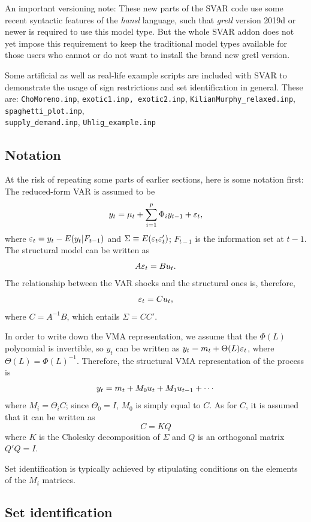 \documentclass[a4paper,10pt]{article}
\newcounter{script}[section]
\newcommand{\PrE}[1]{\ensuremath \varepsilon_{#1}}
\newcommand{\StS}[1]{\ensuremath u_{#1}}
\begin{document}
An important versioning note: These new parts of the SVAR code use some recent 
syntactic features of the \textsl{hansl} language, such that \textsl{gretl} version 
2019d or newer is required to use this model type.
But the whole SVAR addon does not yet impose this requirement to keep the traditional
model types available for those users who cannot or do not want to install the brand
new gretl version.

Some artificial as well as real-life example scripts are included with SVAR to demonstrate
the usage of sign restrictions and set identification in general. These are: 
\texttt{ChoMoreno.inp}, \texttt{exotic1.inp, exotic2.inp}, \texttt{KilianMurphy\_relaxed.inp}, 
\texttt{spaghetti\_plot.inp}, \\
\texttt{supply\_demand.inp}, \texttt{Uhlig\_example.inp}

\subsection{Notation}

At the risk of repeating some parts of earlier sections, here is some notation first:
The reduced-form VAR is assumed to be
\[
  y_t  =  \mu_t + \sum_{i=1}^p \Phi_i y_{t-1} + \PrE{t}, 
\]
where $\PrE{t} = y_t - E(y_t |F_{t-1})$ and
$\Sigma \equiv E(\PrE{t} \PrE{t}')$; $F_{t-1}$ is the information set
at $t-1$. The structural model can be written as
\[
  A \PrE{t} = B \StS{t} .
\]
The relationship between the VAR shocks and the structural ones is,
therefore,
\[
\PrE{t} = C \StS{t} ,
\]
where $C = A^{-1} B$, which entails $\Sigma = CC'$.

In order to write down the VMA representation, we assume that the
$\Phi(L)$ polynomial is invertible, so $y_t$ can be written as
$ y_t = m_t + \Theta(L) \PrE{t}$, where $\Theta(L) =
\Phi(L)^{-1}$. Therefore, the structural VMA representation of the
process is
\[
y_t = m_t + M_0 \StS{t} + M_1 \StS{t-1} + \cdots
\]
where $M_i = \Theta_i C$; since $\Theta_0 = I$, $M_0$ is simply equal
to $C$. As for $C$, it is assumed that it can be written as
\begin{equation}
  \label{eq:rotation}
  C = K Q
\end{equation}
where $K$ is the Cholesky decomposition of $\Sigma$ and $Q$ is an
orthogonal matrix $Q'Q = I$.

Set identification is typically achieved by stipulating conditions on
the elements of the $M_i$ matrices.

\subsection{Set identification}
\end{document}
